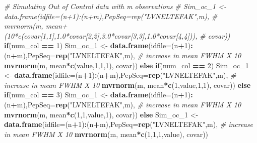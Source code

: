 \documentclass[]{article}
\newenvironment{Shaded}{\begin{snugshade}}{\end{snugshade}}
\newcommand{\KeywordTok}[1]{\textcolor[rgb]{0.13,0.29,0.53}{\textbf{#1}}}
\newcommand{\DataTypeTok}[1]{\textcolor[rgb]{0.13,0.29,0.53}{#1}}
\newcommand{\DecValTok}[1]{\textcolor[rgb]{0.00,0.00,0.81}{#1}}
\newcommand{\StringTok}[1]{\textcolor[rgb]{0.31,0.60,0.02}{#1}}
\newcommand{\CommentTok}[1]{\textcolor[rgb]{0.56,0.35,0.01}{\textit{#1}}}
\newcommand{\ControlFlowTok}[1]{\textcolor[rgb]{0.13,0.29,0.53}{\textbf{#1}}}
\newcommand{\OperatorTok}[1]{\textcolor[rgb]{0.81,0.36,0.00}{\textbf{#1}}}
\newcommand{\NormalTok}[1]{#1}
\begin{document}
\begin{Shaded}
\begin{Highlighting}[]
  
  
  \CommentTok{# Simulating Out of Control data with m observations}
  \CommentTok{# Sim_oc_1 <-data.frame(idfile=(n+1):(n+m),PepSeq=rep("LVNELTEFAK",m),}
  \CommentTok{#                   mvrnorm(m, mean+(10*c(covar[1,1],1.0*covar[2,2],3.0*covar[3,3],1.0*covar[4,4])), }
  \CommentTok{#                  covar))}
  \ControlFlowTok{if}\NormalTok{(num_col }\OperatorTok{==}\StringTok{ }\DecValTok{1}\NormalTok{)}
\NormalTok{    Sim_oc_}\DecValTok{1}\NormalTok{ <-}\StringTok{ }\KeywordTok{data.frame}\NormalTok{(}\DataTypeTok{idfile=}\NormalTok{(n}\OperatorTok{+}\DecValTok{1}\NormalTok{)}\OperatorTok{:}\NormalTok{(n}\OperatorTok{+}\NormalTok{m),}\DataTypeTok{PepSeq=}\KeywordTok{rep}\NormalTok{(}\StringTok{"LVNELTEFAK"}\NormalTok{,m), }\CommentTok{# increase in mean FWHM X 10 }
                    \KeywordTok{mvrnorm}\NormalTok{(m, mean}\OperatorTok{*}\KeywordTok{c}\NormalTok{(value,}\DecValTok{1}\NormalTok{,}\DecValTok{1}\NormalTok{,}\DecValTok{1}\NormalTok{), }
\NormalTok{                   covar))}
  \ControlFlowTok{else} \ControlFlowTok{if}\NormalTok{(num_col }\OperatorTok{==}\StringTok{ }\DecValTok{2}\NormalTok{)}
\NormalTok{     Sim_oc_}\DecValTok{1}\NormalTok{ <-}\StringTok{ }\KeywordTok{data.frame}\NormalTok{(}\DataTypeTok{idfile=}\NormalTok{(n}\OperatorTok{+}\DecValTok{1}\NormalTok{)}\OperatorTok{:}\NormalTok{(n}\OperatorTok{+}\NormalTok{m),}\DataTypeTok{PepSeq=}\KeywordTok{rep}\NormalTok{(}\StringTok{"LVNELTEFAK"}\NormalTok{,m), }\CommentTok{# increase in mean FWHM X 10 }
                    \KeywordTok{mvrnorm}\NormalTok{(m, mean}\OperatorTok{*}\KeywordTok{c}\NormalTok{(}\DecValTok{1}\NormalTok{,value,}\DecValTok{1}\NormalTok{,}\DecValTok{1}\NormalTok{), }
\NormalTok{                   covar))}
  \ControlFlowTok{else} \ControlFlowTok{if}\NormalTok{(num_col }\OperatorTok{==}\StringTok{ }\DecValTok{3}\NormalTok{)}
\NormalTok{     Sim_oc_}\DecValTok{1}\NormalTok{ <-}\StringTok{ }\KeywordTok{data.frame}\NormalTok{(}\DataTypeTok{idfile=}\NormalTok{(n}\OperatorTok{+}\DecValTok{1}\NormalTok{)}\OperatorTok{:}\NormalTok{(n}\OperatorTok{+}\NormalTok{m),}\DataTypeTok{PepSeq=}\KeywordTok{rep}\NormalTok{(}\StringTok{"LVNELTEFAK"}\NormalTok{,m), }\CommentTok{# increase in mean FWHM X 10 }
                    \KeywordTok{mvrnorm}\NormalTok{(m, mean}\OperatorTok{*}\KeywordTok{c}\NormalTok{(}\DecValTok{1}\NormalTok{,}\DecValTok{1}\NormalTok{,value,}\DecValTok{1}\NormalTok{), }
\NormalTok{                   covar))}
  \ControlFlowTok{else}
\NormalTok{     Sim_oc_}\DecValTok{1}\NormalTok{ <-}\StringTok{ }\KeywordTok{data.frame}\NormalTok{(}\DataTypeTok{idfile=}\NormalTok{(n}\OperatorTok{+}\DecValTok{1}\NormalTok{)}\OperatorTok{:}\NormalTok{(n}\OperatorTok{+}\NormalTok{m),}\DataTypeTok{PepSeq=}\KeywordTok{rep}\NormalTok{(}\StringTok{"LVNELTEFAK"}\NormalTok{,m), }\CommentTok{# increase in mean FWHM X 10 }
                    \KeywordTok{mvrnorm}\NormalTok{(m, mean}\OperatorTok{*}\KeywordTok{c}\NormalTok{(}\DecValTok{1}\NormalTok{,}\DecValTok{1}\NormalTok{,}\DecValTok{1}\NormalTok{,value), }
\NormalTok{                   covar))}
  

\end{Highlighting}
\end{Shaded}
\end{document}
